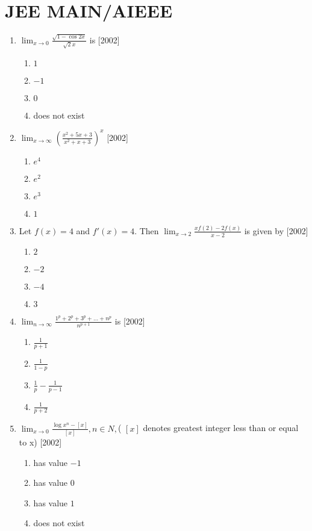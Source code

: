 \documentclass[journal,12pt,twocolumn]{IEEEtran}
\theoremstyle{remark}
\begin{document}
\section*{\textbf{JEE MAIN/AIEEE}}
\begin{enumerate}
    \item $\lim_{x\to 0}{\frac{\sqrt{1-\cos{2x}}}{\sqrt{2}x}}$ is
	    \hfill[2002]
    \begin{enumerate}[label=(\alph*)]
			\item $1$
			\item $-1$
			\item $0$
			\item does not exist
		\end{enumerate}
    \item  $\lim_{x\to \infty}({\frac{x^2+5x+3}{x^2+x+3}})^x$
	    \hfill[2002]
    \begin{enumerate}[label=(\alph*)]
			\item $e^4$
			\item $e^2$
			\item $e^3$
			\item $1$
		\end{enumerate}
    \item Let $f(x)=4$ and $f'(x)=4$. Then $\lim_{x\to 2}{\frac{xf(2)-2f(x)}{x-2}}$ is given by
	    \hfill[2002]
    \begin{enumerate}[label=(\alph*)]
			\item $2$
			\item $-2$
			\item $-4$
			\item $3$
		\end{enumerate}
    \item $\lim_{n\to \infty}{\frac{1^p+2^p+3^p+\dots+n^p}{n^{p+1}}}$ is
	    \hfill[2002]
    \begin{enumerate}[label=(\alph*)]
			\item $\frac{1}{p+1}$
			\item $\frac{1}{1-p}$
			\item $\frac{1}{p}-\frac{1}{p-1}$
			\item $\frac{1}{p+2}$
		\end{enumerate}
\newpage
    \item $\lim_{x\to 0}{\frac{\log x^n- [x]}{[x]}}, n\in N, $( $[x]$ denotes greatest integer less than or equal to x)
	    \hfill[2002]
    \begin{enumerate}[label=(\alph*)]
			\item has value $-1$
			\item has value $0$
			\item has value $1$
			\item does not exist
		\end{enumerate}

\end{enumerate}
\end{document}
